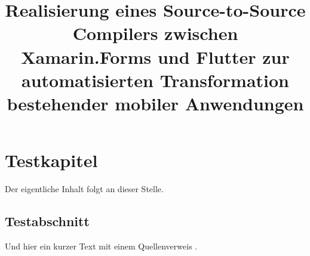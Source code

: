 \documentclass{scrbook} %
\title{Realisierung eines Source-to-Source Compilers zwischen Xamarin.Forms und Flutter zur automatisierten Transformation bestehender mobiler Anwendungen}
\begin{document}
  \maketitle          %
  \frontmatter        %
  \tableofcontents    %
  \mainmatter         %
  
\chapter{Testkapitel}
Der eigentliche Inhalt folgt an dieser Stelle.

\section{Testabschnitt}
Und hier ein kurzer Text mit einem Quellenverweis \autocite{Schlosser14}.

  
  \appendix                       %
  \listoftables                   %
  \listoffigures                  %
  \printbibliography              %
  \printEidesstattlicheErklaerung %
\end{document}
